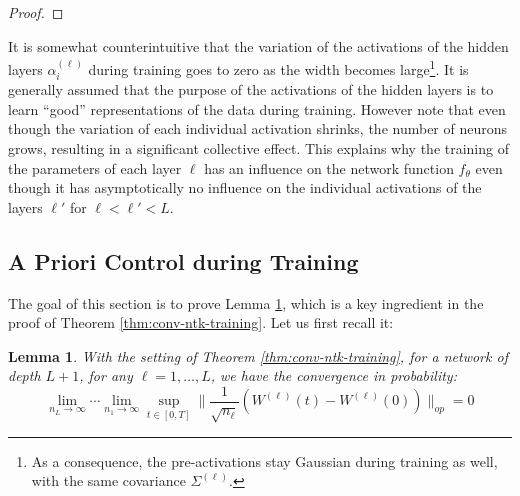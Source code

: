 \documentclass{article}
\newtheorem{lem}{Lemma}
\begin{document}
\begin{proof}

\end{proof}

It is somewhat counterintuitive that the variation of the activations of the hidden layers $\alpha^{(\ell)}_i$ during training goes to zero as the width becomes large\footnote{As a consequence, the pre-activations stay Gaussian during training as well, with the same covariance $\Sigma^{(\ell)}$.}. It is generally assumed that the purpose of the activations of the hidden layers is to learn ``good'' representations of the data during training. However note that even though the variation of each individual activation shrinks, the number of neurons grows, resulting in a significant collective effect. This explains why the training of the parameters of each layer $\ell$ has an influence on the network function $f_\theta$ even though it has asymptotically no influence on the individual activations of the layers $\ell'$ for $\ell<\ell'<L$.

\subsection{A Priori Control during Training} \label{Appendix-3}
The goal of this section is to prove Lemma \ref{lem:control-w}, which is a key ingredient in the proof of Theorem \ref{thm:conv-ntk-training}. Let us first recall it:
\setcounter{lem}{0}
\begin{lem} \label{lem:control-w}
With the setting of Theorem \ref{thm:conv-ntk-training}, for a network of depth $ L + 1$, for any $ \ell =1, \ldots, L $, we have the convergence in probability:  \[ 
\lim_{n_L \to \infty} \cdots \lim_{n_1 \to \infty} 	
\sup_{t \in [0, T]} \lVert \frac{1}{\sqrt{n_\ell}} \left( W^{(\ell)}(t) - W^{(\ell)}(0) \right) \rVert_{op} = 0
\]
\end{lem}
\end{document}

